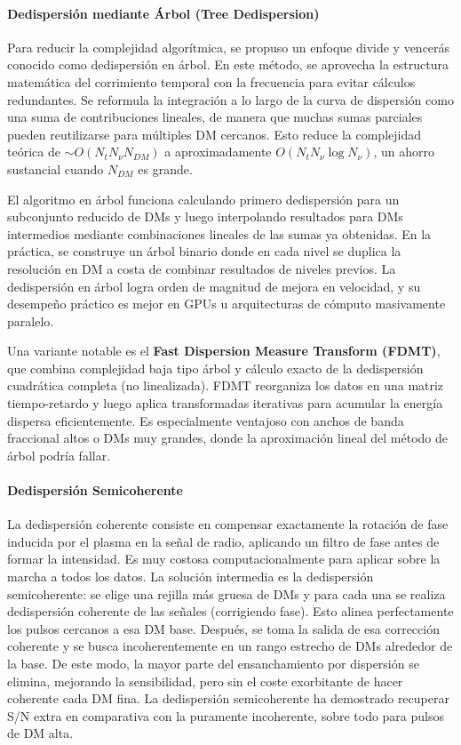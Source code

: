 \paragraph{Dedispersión mediante Árbol (Tree Dedispersion)}

Para reducir la complejidad algorítmica, se propuso un enfoque divide y vencerás conocido como dedispersión en árbol. En este método, se aprovecha la estructura matemática del corrimiento temporal con la frecuencia para evitar cálculos redundantes. Se reformula la integración a lo largo de la curva de dispersión como una suma de contribuciones lineales, de manera que muchas sumas parciales pueden reutilizarse para múltiples DM cercanos. Esto reduce la complejidad teórica de $\sim O(N_t N_\nu N_{DM})$ a aproximadamente $O(N_t N_\nu \log N_\nu)$, un ahorro sustancial cuando $N_{DM}$ es grande.

El algoritmo en árbol funciona calculando primero dedispersión para un subconjunto reducido de DMs y luego interpolando resultados para DMs intermedios mediante combinaciones lineales de las sumas ya obtenidas. En la práctica, se construye un árbol binario donde en cada nivel se duplica la resolución en DM a costa de combinar resultados de niveles previos. La dedispersión en árbol logra orden de magnitud de mejora en velocidad, y su desempeño práctico es mejor en GPUs u arquitecturas de cómputo masivamente paralelo.

Una variante notable es el \textbf{Fast Dispersion Measure Transform (FDMT)}, que combina complejidad baja tipo árbol y cálculo exacto de la dedispersión cuadrática completa (no linealizada). FDMT reorganiza los datos en una matriz tiempo-retardo y luego aplica transformadas iterativas para acumular la energía dispersa eficientemente. Es especialmente ventajoso con anchos de banda fraccional altos o DMs muy grandes, donde la aproximación lineal del método de árbol podría fallar.

\paragraph{Dedispersión Semicoherente}

La dedispersión coherente consiste en compensar exactamente la rotación de fase inducida por el plasma en la señal de radio, aplicando un filtro de fase antes de formar la intensidad. Es muy costosa computacionalmente para aplicar sobre la marcha a todos los datos. La solución intermedia es la dedispersión semicoherente: se elige una rejilla más gruesa de DMs y para cada una se realiza dedispersión coherente de las señales (corrigiendo fase). Esto alinea perfectamente los pulsos cercanos a esa DM base. Después, se toma la salida de esa corrección coherente y se busca incoherentemente en un rango estrecho de DMs alrededor de la base. De este modo, la mayor parte del ensanchamiento por dispersión se elimina, mejorando la sensibilidad, pero sin el coste exorbitante de hacer coherente cada DM fina. La dedispersión semicoherente ha demostrado recuperar S/N extra en comparativa con la puramente incoherente, sobre todo para pulsos de DM alta.

